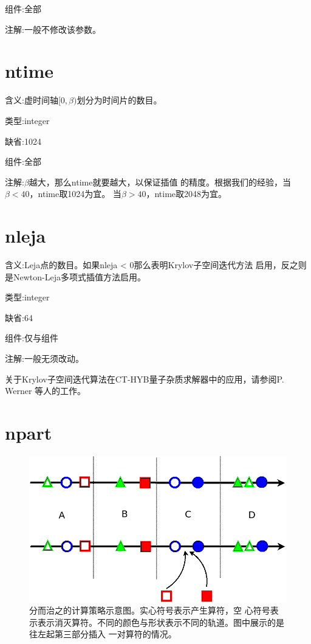 {\color{brown}组件}:全部

{\color{purple}注解}:一般不修改该参数。

\section{ntime }
\label{sec:ntime}

{\color{red}含义}:虚时间轴$[0,\beta)$划分为时间片的数目。

{\color{green}类型}:integer

{\color{blue}缺省}:1024

{\color{brown}组件}:全部

{\color{purple}注解}:$\beta$越大，那么ntime就要越大，以保证插值
的精度。根据我们的经验，当$\beta < 40$，ntime取1024为宜。
当$\beta > 40$，ntime取2048为宜。

\section{nleja }
\label{sec:nleja}

{\color{red}含义}:Leja点的数目。如果nleja < 0那么表明Krylov子空间迭代方法
启用，反之则是Newton-Leja多项式插值方法启用。

{\color{green}类型}:integer

{\color{blue}缺省}:64

{\color{brown}组件}:仅{\camellia}与{\epiphyllum}组件

{\color{purple}注解}:一般无须改动。

关于Krylov子空间迭代算法在CT-HYB量子杂质求解器中的应用，请参阅P. Werner
等人的工作\cite{lauchli:235117}。

\section{npart }
\label{sec:npart}

\begin{figure}
\centering
\includegraphics[scale=0.50]{figure/dc.png}
\caption[分而治之的计算策略示意图]{分而治之的计算策略示意图。实心符号表示产生算符，空
心符号表示表示消灭算符。不同的颜色与形状表示不同的轨道。图中展示的是往左起第三部分插入
一对算符的情况。}
\label{fig:dac}
\end{figure}

